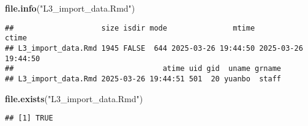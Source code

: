 \documentclass[
]{article}
\newenvironment{Shaded}{\begin{snugshade}}{\end{snugshade}}
\newcommand{\FunctionTok}[1]{\textcolor[rgb]{0.13,0.29,0.53}{\textbf{#1}}}
\newcommand{\NormalTok}[1]{#1}
\newcommand{\StringTok}[1]{\textcolor[rgb]{0.31,0.60,0.02}{#1}}
\begin{document}
\begin{Shaded}
\begin{Highlighting}[]
\FunctionTok{file.info}\NormalTok{(}\StringTok{"L3\_import\_data.Rmd"}\NormalTok{)}
\end{Highlighting}
\end{Shaded}

\begin{verbatim}
##                    size isdir mode               mtime               ctime
## L3_import_data.Rmd 1945 FALSE  644 2025-03-26 19:44:50 2025-03-26 19:44:50
##                                  atime uid gid  uname grname
## L3_import_data.Rmd 2025-03-26 19:44:51 501  20 yuanbo  staff
\end{verbatim}

\begin{Shaded}
\begin{Highlighting}[]
\FunctionTok{file.exists}\NormalTok{(}\StringTok{"L3\_import\_data.Rmd"}\NormalTok{)}
\end{Highlighting}
\end{Shaded}

\begin{verbatim}
## [1] TRUE
\end{verbatim}
\end{document}
